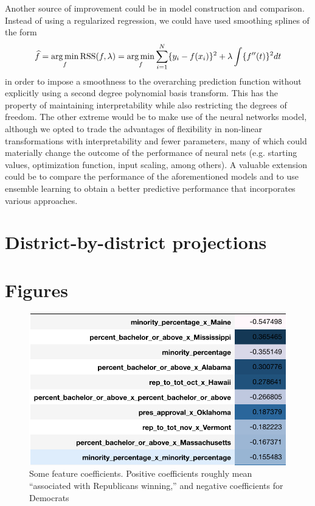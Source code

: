 \documentclass[12pt, letterpaper]{article}
\begin{document}
Another source of improvement could be in model construction and comparison. Instead of using a regularized regression, we could have used smoothing splines of the form $$
\widehat f = \operatorname*{arg\,min}_f 
\mathrm{RSS}(f, \lambda) = \operatorname*{arg\,min}_f \sum_{i=1}^{N}\{y_i - f(x_i)\}^2 + \lambda \int \{f''(t)\}^2dt$$ in order to impose a smoothness to the overarching prediction function without explicitly using a second degree polynomial basis transform. This has the property of maintaining interpretability while also restricting the degrees of freedom. The other extreme would be to make use of the neural networks model, although we opted to trade the advantages of flexibility in non-linear transformations with interpretability and fewer parameters, many of which could materially change the outcome of the performance of neural nets (e.g. starting values, optimization function, input scaling, among others). A valuable extension could be to compare the performance of the aforementioned models and to use ensemble learning to obtain a better predictive performance that incorporates various approaches.





\newpage
\appendix

\section{District-by-district projections}
\label{sec:district_results}





\section{Figures}
\label{sec:figures}

\begin{figure}[tbh]
  \centering
  \includegraphics[scale=0.8]{feature_coeff}
  \caption{Some feature coefficients. Positive coefficients roughly mean ``associated with Republicans winning,'' and negative coefficients for Democrats}
  \label{fig:feature}
\end{figure}
\end{document}
